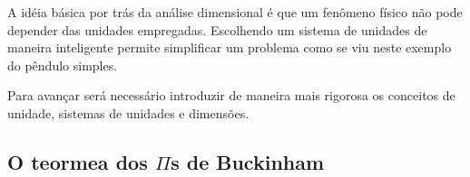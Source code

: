 A idéia básica por trás da análise dimensional é que um fenômeno físico não pode depender das unidades empregadas. Escolhendo um sistema de unidades de maneira inteligente permite simplificar um problema como se viu neste exemplo do pêndulo simples.

Para avançar será necessário introduzir de maneira mais rigorosa os conceitos de unidade, sistemas de unidades e dimensões.

\subsection{O teormea dos $\Pi$s de Buckinham}
